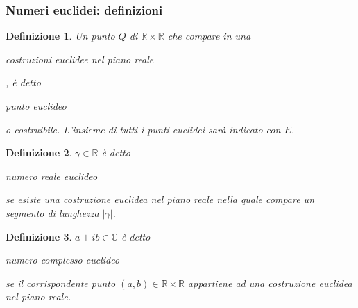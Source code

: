 \documentclass[11pt]{beamer}
\newtheorem{definizione}{Definizione}
\begin{document}
\begin{frame}
\frametitle{Numeri euclidei: definizioni}

\begin{definizione}
Un punto $Q$ di $\mathbb{R}\times\mathbb{R}$ che compare in una \begin{bfseries}costruzioni euclidee nel piano reale\end{bfseries}, è detto \begin{bfseries}punto euclideo\end{bfseries}  o costruibile. L'insieme di tutti i punti euclidei sarà indicato con $E$.
\end{definizione}

\begin{definizione}
$\gamma \in \mathbb{R}$ è detto \begin{bfseries}numero reale euclideo\end{bfseries} se esiste una costruzione euclidea nel piano reale nella quale compare un segmento di lunghezza $|\gamma|$.
\end{definizione}

\begin{definizione}
$a + i b \in \mathbb{C}$ è detto \begin{bfseries}numero complesso euclideo\end{bfseries} se il corrispondente punto $(a, b) \in \mathbb{R}\times\mathbb{R}$ appartiene ad una costruzione euclidea nel piano reale.
\end{definizione}

\end{frame}
\end{document}
